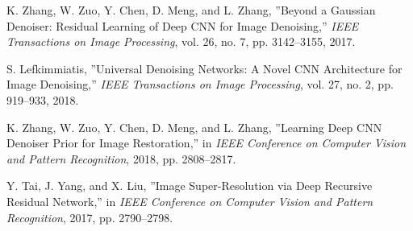 \documentclass[a4paper,
               ]{jacow}
\begin{document}
{\begin{thebibliography}{9}
        K. Zhang, W. Zuo, Y. Chen, D. Meng, and L. Zhang,
        ''Beyond a Gaussian Denoiser: Residual Learning of Deep CNN for Image Denoising,''
        \emph{IEEE Transactions on Image Processing}, vol. 26, no. 7, pp. 3142--3155, 2017.

        S. Lefkimmiatis,
        ''Universal Denoising Networks: A Novel CNN Architecture for Image Denoising,''
        \emph{IEEE Transactions on Image Processing}, vol. 27, no. 2, pp. 919--933, 2018.

        K. Zhang, W. Zuo, Y. Chen, D. Meng, and L. Zhang,
        ''Learning Deep CNN Denoiser Prior for Image Restoration,''
        in \emph{IEEE Conference on Computer Vision and Pattern Recognition}, 2018, pp. 2808--2817.

        Y. Tai, J. Yang, and X. Liu,
        ''Image Super-Resolution via Deep Recursive Residual Network,''
        in \emph{IEEE Conference on Computer Vision and Pattern Recognition}, 2017, pp. 2790--2798.


	\end{thebibliography}
} %
%
%

\end{document}

